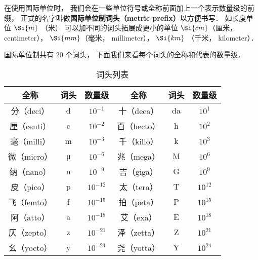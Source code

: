 

在使用国际单位时， 我们会在一些单位符号或全称前面加上一个表示数量级的前缀， 正式的名字叫做\textbf{国际单位制词头（metric prefix）}以方便书写． 如长度单位 $\Si{m}$ （米） 可以加不同的词头拓展成更小的单位 $\Si{cm}$（厘米， centimeter）， $\Si{mm}$（毫米， millimeter）， $\Si{km}$ （千米， kilometer）．

国际单位制共有 20 个词头， 下面我们来看每个词头的全称和代表的数量级．

\begin{table}[ht]
\centering
\caption{词头列表}\label{UniPre_tab1}
\begin{tabular}{|c|c|c|c|c|c|}
\hline
全称 & 词头 & 数量级 & 全称 & 词头 & 数量级 \\
\hline
分（deci） & d & $10^{-1}$ & 十（deca） & da & $10^1$ \\
\hline
厘（centi） & c & $10^{-2}$ & 百（hecto） & h & $10^2$ \\
\hline
毫（milli） & m & $10^{-3}$ & 千（killo） & k & $10^3$ \\
\hline
微（micro） & μ & $10^{-6}$ & 兆（mega） & M & $10^6$ \\
\hline
纳（nano） & n & $10^{-9}$ & 吉（giga） & G & $10^9$ \\
\hline
皮（pico） & p & $10^{-12}$ & 太（tera） & T & $10^{12}$ \\
\hline
飞（femto） & f & $10^{-15}$ & 拍（peta） & P & $10^{15}$ \\
\hline
阿（atto） & a & $10^{-18}$ & 艾（exa） & E & $10^{18}$ \\
\hline
仄（zepto） & z & $10^{-21}$ & 泽（zetta） & Z & $10^{21}$ \\
\hline
幺（yocto） & y & $10^{-24}$ & 尧（yotta） & Y & $10^{24}$ \\
\hline
\end{tabular}
\end{table}
